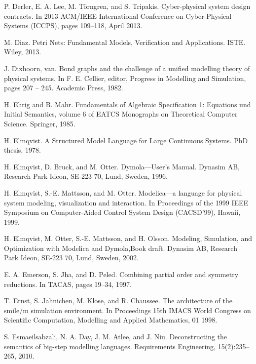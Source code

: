\begin{description}[style=nextline,leftmargin=12mm,labelwidth=10mm,font=\normalfont]
\item[{[84]}] P. Derler, E. A. Lee, M. Törngren, and S. Tripakis. Cyber-physical system design contracts. In 2013 ACM/IEEE International Conference on Cyber-Physical Systems (ICCPS), pages 109–118, April 2013.

\item[{[85]}] M. Diaz. Petri Nets: Fundamental Models, Verification and Applications. ISTE. Wiley, 2013.

\item[{[86]}] J. Dixhoorn, van. Bond graphs and the challenge of a unified modelling theory of physical systems. In F. E. Cellier, editor, Progress in Modelling and Simulation, pages 207 – 245. Academic Press, 1982.

\item[{[87]}] H. Ehrig and B. Mahr. Fundamentals of Algebraic Specification 1: Equations und Initial Semantics, volume 6 of EATCS Monographs on Theoretical Computer Science. Springer, 1985.

\item[{[88]}] H. Elmqvist. A Structured Model Language for Large Continuous Systems. PhD thesis, 1978.

\item[{[89]}] H. Elmqvist, D. Bruck, and M. Otter. Dymola—User’s Manual. Dynasim AB, Research Park Ideon, SE-223 70, Lund, Sweden, 1996.

\item[{[90]}] H. Elmqvist, S.-E. Mattsson, and M. Otter. Modelica—a language for physical system modeling, visualization and interaction. In Proceedings of the 1999 IEEE Symposium on Computer-Aided Control System Design (CACSD’99), Hawaii, 1999.

\item[{[91]}] H. Elmqvist, M. Otter, S.-E. Mattsson, and H. Olsson. Modeling, Simulation, and Optimization with Modelica and Dymola,Book draft. Dynasim AB, Research Park Ideon, SE-223 70, Lund, Sweden, 2002.

\item[{[92]}] E. A. Emerson, S. Jha, and D. Peled. Combining partial order and symmetry reductions. In TACAS, pages 19–34, 1997.

\item[{[93]}] T. Ernst, S. Jahnichen, M. Klose, and R. Chaussee. The architecture of the smile/m simulation environment. In Proceedings 15th IMACS World Congress on Scientific Computation, Modelling and Applied Mathematics, 01 1998.

\item[{[94]}] S. Esmaeilsabzali, N. A. Day, J. M. Atlee, and J. Niu. Deconstructing the semantics of big-step modelling languages. Requirements Engineering, 15(2):235–265, 2010.


\end{description}
